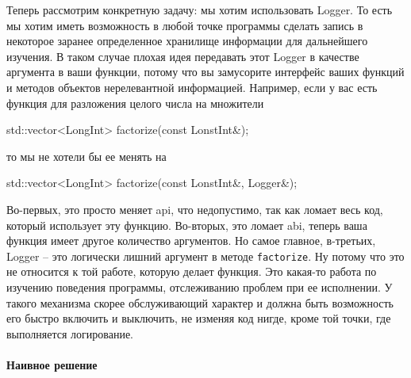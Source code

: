 Теперь рассмотрим конкретную задачу: мы хотим использовать Logger.
То есть мы хотим иметь возможность в любой точке программы сделать запись в некоторое заранее определенное хранилище информации для дальнейшего изучения.
В таком случае плохая идея передавать этот Logger в качестве аргумента в ваши функции, потому что вы замусорите интерфейс ваших функций и методов объектов нерелевантной информацией.
Например, если у вас есть функция для разложения целого числа на множители
\begin{cppcode}
std::vector<LongInt> factorize(const LonstInt&);
\end{cppcode}
то мы не хотели бы ее менять на
\begin{cppcode}
std::vector<LongInt> factorize(const LonstInt&, Logger&);
\end{cppcode}
Во-первых, это просто меняет api, что недопустимо, так как ломает весь код, который использует эту функцию.
Во-вторых, это ломает abi, теперь ваша функция имеет другое количество аргументов.
Но самое главное, в-третьих, Logger -- это логически лишний аргумент в методе \verb"factorize".
Ну потому что это не относится к той работе, которую делает функция.
Это какая-то работа по изучению поведения программы, отслеживанию проблем при ее исполнении.
У такого механизма скорее обслуживающий характер и должна быть возможность его быстро включить и выключить, не изменяя код нигде, кроме той точки, где выполняется логирование.

\paragraph{Наивное решение}

